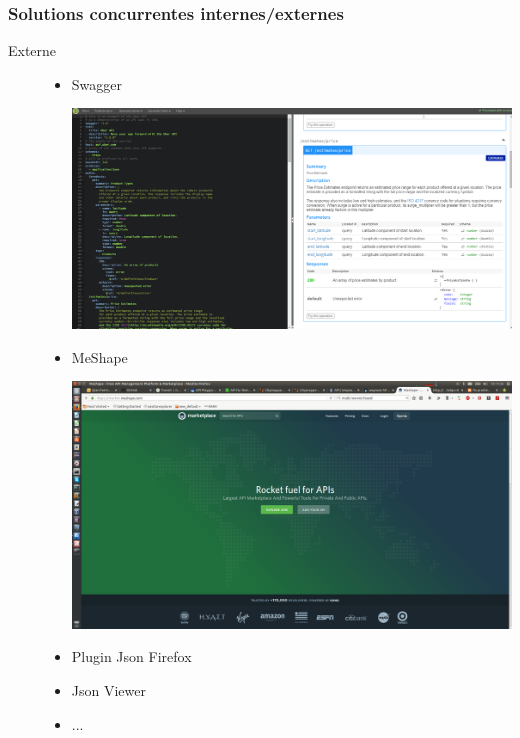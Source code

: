 \documentclass[table]{beamer}
\begin{document}
\begin{frame}
  \frametitle{Solutions concurrentes internes/externes}
  \begin{description}
    \item[Externe] 
    \begin{itemize} 
      \item Swagger 
      \begin{center}
        \includegraphics[height=0.3\textheight]{images/swagger}
      \end{center}
      \item MeShape 
      \begin{center}
        \includegraphics[height=0.3\textheight]{images/marketplace}
      \end{center}
      \item Plugin Json Firefox
      \item Json Viewer
      \item ...
    \end{itemize}
  \end{description}
\end{frame}
\end{document}
